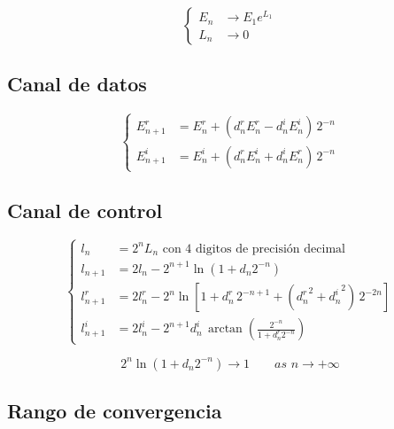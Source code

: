 \documentclass[10pt,a4paper]{book}
\begin{document}
\begin{equation} \label{eq:bkm_E_mode}
   \left\{
      \begin{aligned}
         E_n & \rightarrow E_1 e^{L_1} \\
         L_n & \rightarrow 0
      \end{aligned}
   \right.
\end{equation}

   \subsection{Canal de datos}
\begin{equation} \label{eq:bkm_eqs_E}
   \left\{
      \begin{aligned}
         E_{n+1}^r &= E_n^r + ( d_n^r E_n^r - d_n^i E_n^i ) \,2^{-n} \\
         E_{n+1}^i &= E_n^i + ( d_n^r E_n^i + d_n^i E_n^r ) \,2^{-n}
      \end{aligned}
   \right.
\end{equation}

   \subsection{Canal de control}
\begin{equation} \label{eq:bkm_eqs_l}
   \left\{
      \begin{aligned}
         l_n         &= 2^n L_n \,\,\text{con 4 digitos de precisión decimal} \\
         l_{n+1}     &= 2 l_n   - 2^{n+1} \ln( 1 + d_n 2^{-n} )                                             \\
         l_{n+1}^r   &= 2 l_n^r - 2^{n}   \ln[ 1 + d_n^r \, 2^{-n+1} + ({d_n^r}^2 + {d_n^i}^2) \, 2^{-2n} ] \\
         l_{n+1}^i   &= 2 l_n^i - 2^{n+1} d_n^i \, \arctan{ \left( \frac{2^{-n}}{1+d_n^r 2^{-n}} \right) }
      \end{aligned}
   \right.
\end{equation}

\begin{equation} \label{eq:bkm_eqs_l_limit}
   2^{n} \ln( 1 + d_n 2^{-n} ) \rightarrow 1 \qquad as \,\, n \rightarrow +\infty
\end{equation}

   \subsection{Rango de convergencia}
\end{document}
